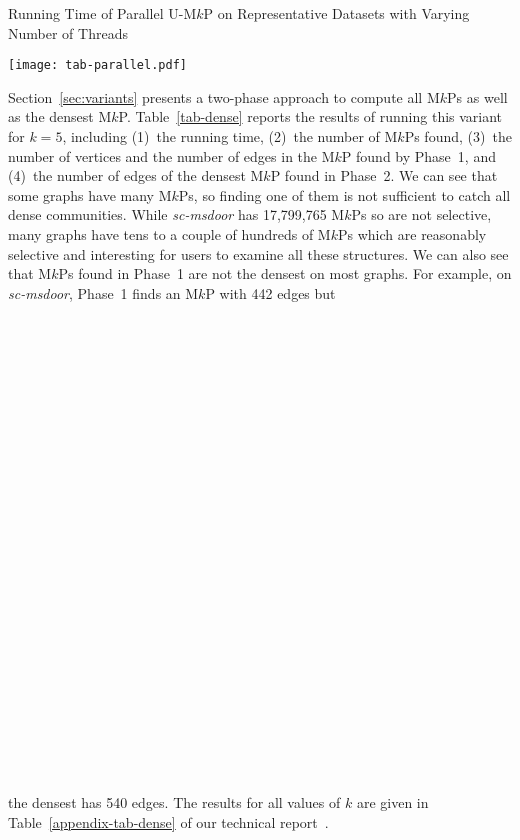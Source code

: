\documentclass[sigconf, nonacm]{acmart}
\begin{document}
\setcounter{table}{7}
\begin{table*}
  \caption{Running Time of Parallel U-M$k$P on Representative Datasets with Varying Number of Threads}\label{tab-parallel}
  \vspace{-3mm}
  \texttt{[image: tab-parallel.pdf]}
  \vspace{-4mm}
\end{table*}

\vspace{0.3mm}
 Section~\ref{sec:variants} presents a two-phase approach to compute all M$k$Ps as well as the densest M$k$P. Table~\ref{tab-dense} reports the results of running this variant for $k=5$, including (1)~the running time, (2)~the number of M$k$Ps found, (3)~the number of vertices and the number of edges in the M$k$P found by Phase~1, and (4)~the number of edges of the densest M$k$P found in Phase~2. We can see that some graphs have many M$k$Ps, so finding one of them is not sufficient to catch all dense communities. While \textit{sc-msdoor} has 17,799,765 M$k$Ps so are not selective, many graphs have tens to a couple of hundreds of M$k$Ps which are reasonably selective and interesting for users to examine all these structures. We can also see that M$k$Ps found in Phase~1 are not the densest on most graphs. For example, on {\em sc-msdoor}, Phase~1 finds an M$k$P with 442 edges but\\
\\
\\
\\
\\
\\
\\
\\
\\
\\
\\
\\
\\
\\
\\
\\
\\
\\
\\
\\
\\
\\
\\
\\
\\
\\
the densest has 540 edges. The results for all values of $k$ are given in Table~\ref{appendix-tab-dense} of our technical report~\cite{tech_report}. 
\end{document}
